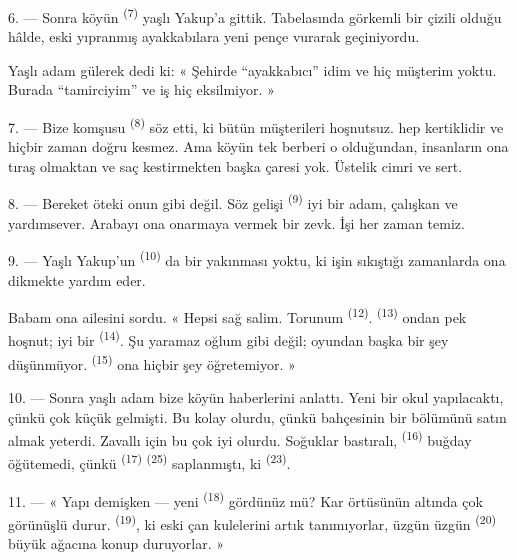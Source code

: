 6. --- Sonra köyün  \textsuperscript{(7)} yaşlı
Yakup'a gittik. Tabelasında görkemli bir  çizili olduğu hâlde,
eski yıpranmış ayakkabılara yeni pençe vurarak geçiniyordu.

Yaşlı adam gülerek dedi ki: « Şehirde “ayakkabıcı” idim ve hiç müşterim
yoktu. Burada “tamirciyim” ve iş hiç eksilmiyor. »

7. --- Bize komşusu  \textsuperscript{(8)} söz etti, ki bütün
müşterileri hoşnutsuz.  hep kertiklidir ve
 hiçbir zaman doğru kesmez. Ama köyün tek berberi o olduğundan,
insanların ona tıraş olmaktan ve saç kestirmekten başka çaresi yok. Üstelik
cimri ve sert.

8. --- Bereket öteki  onun gibi değil. Söz gelişi
 \textsuperscript{(9)} iyi bir adam, çalışkan ve
yardımsever. Arabayı ona onarmaya vermek bir zevk. İşi her zaman temiz.

9. --- Yaşlı Yakup'un  \textsuperscript{(10)} da bir yakınması
yoktu, ki işin sıkıştığı zamanlarda ona  dikmekte yardım
eder.

Babam ona ailesini sordu. « Hepsi sağ salim. Torunum 
\textsuperscript{(12)}.  \textsuperscript{(13)} ondan pek
hoşnut; iyi bir  \textsuperscript{(14)}. Şu yaramaz
oğlum gibi değil; oyundan başka bir şey düşünmüyor. 
\textsuperscript{(15)} ona hiçbir şey öğretemiyor. »

\VUsaut{3.0mm}
\VUsaut{3.0mm}

10. --- Sonra yaşlı adam bize köyün haberlerini anlattı. Yeni bir okul
yapılacaktı, çünkü  çok küçük gelmişti. Bu kolay
olurdu, çünkü  bahçesinin bir bölümünü satın almak
yeterdi. Zavallı için bu çok iyi olurdu. Soğuklar bastıralı, 
\textsuperscript{(16)}  buğday öğütemedi, çünkü
 \textsuperscript{(17)}  \textsuperscript{(25)}
saplanmıştı, ki  \textsuperscript{(23)}.

11. --- « Yapı demişken --- yeni  \textsuperscript{(18)}
gördünüz mü? Kar örtüsünün altında çok görünüşlü durur.
 \textsuperscript{(19)}, ki eski çan kulelerini artık
tanımıyorlar, üzgün üzgün  \textsuperscript{(20)} büyük
ağacına konup duruyorlar. »

